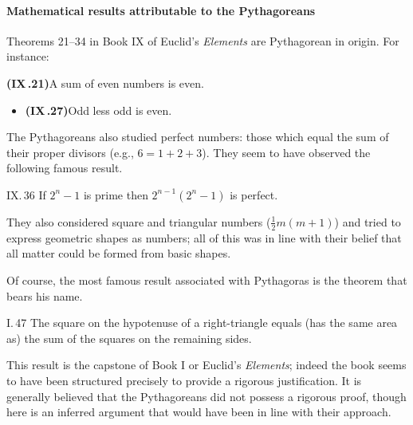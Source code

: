 \paragraph{Mathematical results attributable to the Pythagoreans}

Theorems 21--34 in Book IX of Euclid's \emph{Elements} are Pythagorean in origin. For instance:

\begin{thm*}{}{}
  {\normalfont\textbf{(IX\,.21)}}\lstsp A sum of even numbers is even.\par\vspace{-8pt}
  \begin{itemize}
    \item[]{\normalfont\textbf{(IX\,.27)}}\lstsp Odd less odd is even.
  \end{itemize}
\end{thm*}


The Pythagoreans also studied perfect numbers: those which equal the sum of their proper divisors (e.g., $6=1+2+3$). They seem to have observed the following famous result.

\begin{thm*}{IX.\,36}{}
	If $2^n-1$ is prime then $2^{n-1}(2^n-1)$ is perfect.
\end{thm*}

They also considered square and triangular numbers ($\frac 12m(m+1)$) and tried to express geometric shapes as numbers; all of this was in line with their belief that all matter could be formed from basic shapes.\smallbreak

Of course, the most famous result associated with Pythagoras is the theorem that bears his name.

\begin{thm*}{I.\,47}
	The square on the hypotenuse of a right-triangle equals (has the same area as) the sum of the squares on the remaining sides.
\end{thm*}

This result is the capstone of Book I or Euclid's \emph{Elements}; indeed the book seems to have been structured precisely to provide a rigorous justification. It is generally believed that the Pythagoreans did not possess a rigorous proof, though here is an inferred argument that would have been in line with their approach.

